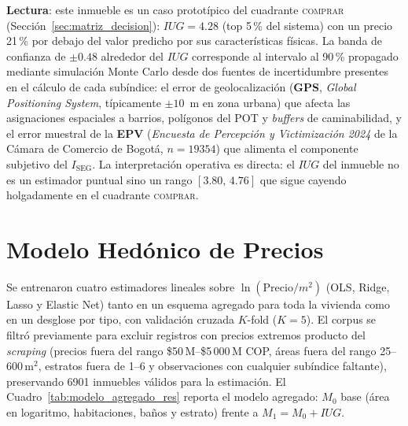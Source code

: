 \documentclass[12pt, a4paper, twoside, openright]{report}
\theoremstyle{plain}
\theoremstyle{definition}
\newcommand{\ISEG}{I_{\text{SEG}}} %
\newcommand{\IUG}{IUG}             %
\begin{document}
\textbf{Lectura}: este inmueble es un caso prototípico del cuadrante \textsc{comprar} (Sección~\ref{sec:matriz_decision}): $\IUG = 4.28$ (top 5\,\% del sistema) con un precio 21\,\% por debajo del valor predicho por sus características físicas. La banda de confianza de $\pm 0.48$ alrededor del $\IUG{}$ corresponde al intervalo al 90\,\% propagado mediante simulación Monte Carlo desde dos fuentes de incertidumbre presentes en el cálculo de cada subíndice: el error de geolocalización (\textbf{GPS}, \textit{Global Positioning System}, típicamente $\pm 10$~m en zona urbana) que afecta las asignaciones espaciales a barrios, polígonos del POT y \emph{buffers} de caminabilidad, y el error muestral de la \textbf{EPV} (\textit{Encuesta de Percepción y Victimización 2024} de la Cámara de Comercio de Bogotá, $n = \num{19354}$) que alimenta el componente subjetivo del $\ISEG$. La interpretación operativa es directa: el $\IUG{}$ del inmueble no es un estimador puntual sino un rango $[3.80,\,4.76]$ que sigue cayendo holgadamente en el cuadrante \textsc{comprar}.


\section{Modelo Hedónico de Precios}\label{sec:modelo_hedonico}

Se entrenaron cuatro estimadores lineales sobre $\ln(\text{Precio}/m^2)$ (OLS, Ridge, Lasso y Elastic Net) tanto en un esquema agregado para toda la vivienda como en un desglose por tipo, con validación cruzada $K$-fold ($K=5$). El corpus se filtró previamente para excluir registros con precios extremos producto del \emph{scraping} (precios fuera del rango \$50\,M--\$5\,000\,M COP, áreas fuera del rango 25--600\,m$^2$, estratos fuera de 1--6 y observaciones con cualquier subíndice faltante), preservando \num{6901} inmuebles válidos para la estimación. El Cuadro~\ref{tab:modelo_agregado_res} reporta el modelo agregado: $M_0$ base (área en logaritmo, habitaciones, baños y estrato) frente a $M_1 = M_0 + \IUG{}$.
\end{document}
